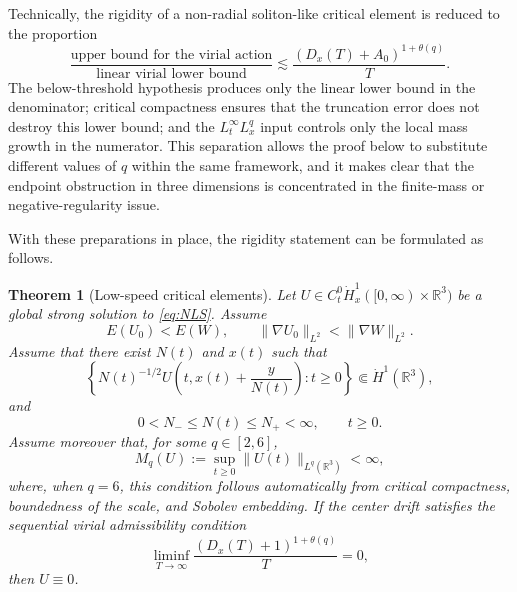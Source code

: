 \documentclass[10pt,a4paper]{amsart}
\numberwithin{equation}{section}
\newtheorem{theorem}{Theorem}[section]
\newcommand{\R}{\mathbb R}
\begin{document}
Technically, the rigidity of a non-radial soliton-like critical element is reduced to the proportion
\[
  \frac{\text{upper bound for the virial action}}{\text{linear virial lower bound}}
  \lesssim
  \frac{(D_x(T)+A_0)^{1+\theta(q)}}{T}.
\]
The below-threshold hypothesis produces only the linear lower bound in the denominator; critical compactness ensures that the truncation error does not destroy this lower bound; and the $L_t^\infty L_x^q$ input controls only the local mass growth in the numerator. This separation allows the proof below to substitute different values of $q$ within the same framework, and it makes clear that the endpoint obstruction in three dimensions is concentrated in the finite-mass or negative-regularity issue.

With these preparations in place, the rigidity statement can be formulated as follows.


\begin{theorem}[Low-speed critical elements]\label{thm:rigidity-general}
Let $U\in C_t^0\dot H_x^1([0,\infty)\times\R^3)$ be a global strong solution to \eqref{eq:NLS}. Assume
\[
  E(U_0)<E(W),
  \qquad \|\nabla U_0\|_{L^2}<\|\nabla W\|_{L^2}.
\]
Assume that there exist $N(t)$ and $x(t)$ such that
\[
  \left\{N(t)^{-1/2}U\left(t,x(t)+\frac{y}{N(t)}\right):t\ge0\right\}
  \Subset\dot H^1(\R^3),
\]
and
\[
  0<N_-\le N(t)\le N_+<\infty,
  \qquad t\ge0.
\]
Assume moreover that, for some $q\in[2,6]$,
\[
  M_q(U):=\sup_{t\ge0}\|U(t)\|_{L^q(\R^3)}<\infty,
\]
where, when $q=6$, this condition follows automatically from critical compactness, boundedness of the scale, and Sobolev embedding. If the center drift satisfies the sequential virial admissibility condition
\begin{equation}\label{eq:rigidity-drift-general}
  \liminf_{T\to\infty}
  \frac{(D_x(T)+1)^{1+\theta(q)}}{T}=0,
\end{equation}
then $U\equiv0$.
\end{theorem}
\end{document}
